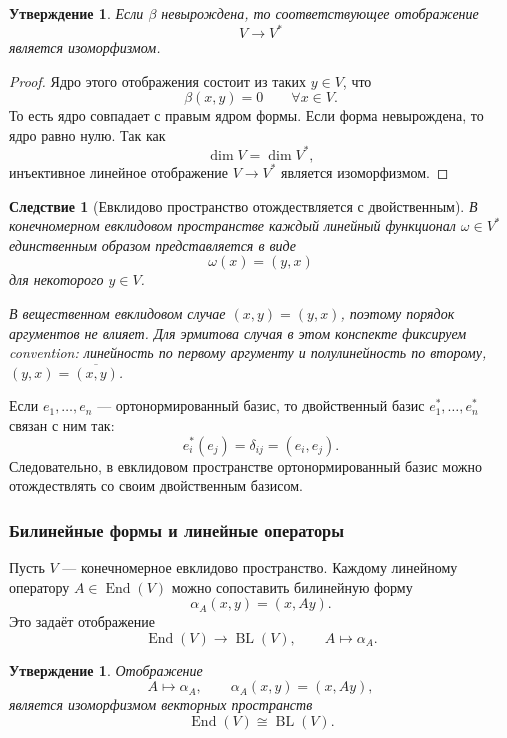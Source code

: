 \documentclass[12pt,a4paper]{article}
\theoremstyle{definition}
\theoremstyle{plain}
\newtheorem{proposition}[definition]{Утверждение}
\newtheorem{corollary}[definition]{Следствие}
\theoremstyle{remark}
\newenvironment{knowledgefix}{\begin{clarifybox}}{\end{clarifybox}}
\newcommand{\BL}{\operatorname{BL}}
\newcommand{\End}{\operatorname{End}}
\begin{document}
\begin{proposition}
Если $\beta$ невырождена, то соответствующее отображение
\[
    V\to V^*
\]
является изоморфизмом.
\end{proposition}

\begin{proof}
Ядро этого отображения состоит из таких $y\in V$, что
\[
    \beta(x,y)=0
    \qquad \forall x\in V.
\]
То есть ядро совпадает с правым ядром формы. Если форма невырождена, то ядро равно нулю.
Так как
\[
    \dim V=\dim V^*,
\]
инъективное линейное отображение $V\to V^*$ является изоморфизмом.
\end{proof}

\begin{corollary}[Евклидово пространство отождествляется с двойственным]
В конечномерном евклидовом пространстве каждый линейный функционал $\omega\in V^*$ единственным образом представляется в виде
\[
    \omega(x)=(y,x)
\]
для некоторого $y\in V$.
\begin{knowledgefix}
В вещественном евклидовом случае \((x,y)=(y,x)\), поэтому порядок аргументов не влияет. Для эрмитова случая в этом конспекте фиксируем convention: линейность по первому аргументу и полулинейность по второму, \((y,x)=\overline{(x,y)}\).
\end{knowledgefix}
\end{corollary}

Если $e_1,\ldots,e_n$ --- ортонормированный базис, то двойственный базис $e_1^*,\ldots,e_n^*$ связан с ним так:
\[
    e_i^*(e_j)=\delta_{ij}=(e_i,e_j).
\]
Следовательно, в евклидовом пространстве ортонормированный базис можно отождествлять со своим двойственным базисом.

\subsubsection*{Билинейные формы и линейные операторы}

Пусть $V$ --- конечномерное евклидово пространство.
Каждому линейному оператору $A\in\End(V)$ можно сопоставить билинейную форму
\[
    \alpha_A(x,y)=(x,Ay).
\]
Это задаёт отображение
\[
    \End(V)\to\BL(V),
    \qquad
    A\mapsto \alpha_A.
\]

\begin{proposition}
Отображение
\[
    A\mapsto \alpha_A,
    \qquad
    \alpha_A(x,y)=(x,Ay),
\]
является изоморфизмом векторных пространств
\[
    \End(V)\cong\BL(V).
\]
\end{proposition}
\end{document}
